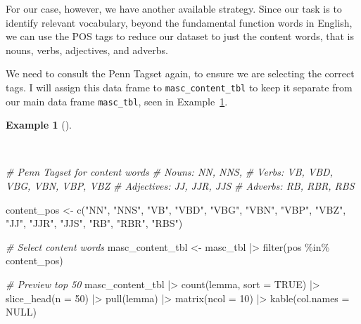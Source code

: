 \documentclass[
  letterpaper,
]{latex/krantz}
\newenvironment{Shaded}{\begin{snugshade}}{\end{snugshade}}
\newcommand{\AttributeTok}[1]{\textcolor[rgb]{0.00,0.00,0.00}{#1}}
\newcommand{\CommentTok}[1]{\textcolor[rgb]{0.00,0.00,0.00}{\textit{#1}}}
\newcommand{\ConstantTok}[1]{\textcolor[rgb]{0.00,0.00,0.00}{#1}}
\newcommand{\DecValTok}[1]{\textcolor[rgb]{0.00,0.00,0.00}{#1}}
\newcommand{\FunctionTok}[1]{\textcolor[rgb]{0.00,0.00,0.00}{#1}}
\newcommand{\NormalTok}[1]{\textcolor[rgb]{0.00,0.00,0.00}{#1}}
\newcommand{\OtherTok}[1]{\textcolor[rgb]{0.00,0.00,0.00}{#1}}
\newcommand{\SpecialCharTok}[1]{\textcolor[rgb]{0.00,0.00,0.00}{#1}}
\newcommand{\StringTok}[1]{\textcolor[rgb]{0.00,0.00,0.00}{#1}}
\theoremstyle{definition}
\newtheorem{example}{Example}[chapter]
\theoremstyle{remark}
\begin{document}
For our case, however, we have another available strategy. Since our
task is to identify relevant vocabulary, beyond the fundamental function
words in English, we can use the POS tags to reduce our dataset to just
the content words, that is nouns, verbs, adjectives, and adverbs.

We need to consult the Penn Tagset again, to ensure we are selecting the
correct tags. I will assign this data frame to
\texttt{masc\_content\_tbl} to keep it separate from our main data frame
\texttt{masc\_tbl}, seen in Example~\ref{exm-eda-masc-filter-pos}.

\begin{example}[]\protect\hypertarget{exm-eda-masc-filter-pos}{}\label{exm-eda-masc-filter-pos}

~

\begin{Shaded}
\begin{Highlighting}[]
\CommentTok{\# Penn Tagset for content words}
\CommentTok{\# Nouns: NN, NNS,}
\CommentTok{\# Verbs: VB, VBD, VBG, VBN, VBP, VBZ}
\CommentTok{\# Adjectives: JJ, JJR, JJS}
\CommentTok{\# Adverbs: RB, RBR, RBS}

\NormalTok{content\_pos }\OtherTok{\textless{}{-}} \FunctionTok{c}\NormalTok{(}\StringTok{"NN"}\NormalTok{, }\StringTok{"NNS"}\NormalTok{, }\StringTok{"VB"}\NormalTok{, }\StringTok{"VBD"}\NormalTok{, }\StringTok{"VBG"}\NormalTok{, }\StringTok{"VBN"}\NormalTok{, }\StringTok{"VBP"}\NormalTok{, }\StringTok{"VBZ"}\NormalTok{, }\StringTok{"JJ"}\NormalTok{, }\StringTok{"JJR"}\NormalTok{, }\StringTok{"JJS"}\NormalTok{, }\StringTok{"RB"}\NormalTok{, }\StringTok{"RBR"}\NormalTok{, }\StringTok{"RBS"}\NormalTok{)}

\CommentTok{\# Select content words}
\NormalTok{masc\_content\_tbl }\OtherTok{\textless{}{-}}
\NormalTok{  masc\_tbl }\SpecialCharTok{|\textgreater{}}
  \FunctionTok{filter}\NormalTok{(pos }\SpecialCharTok{\%in\%}\NormalTok{ content\_pos)}

\CommentTok{\# Preview top 50}
\NormalTok{masc\_content\_tbl }\SpecialCharTok{|\textgreater{}}
  \FunctionTok{count}\NormalTok{(lemma, }\AttributeTok{sort =} \ConstantTok{TRUE}\NormalTok{) }\SpecialCharTok{|\textgreater{}}
  \FunctionTok{slice\_head}\NormalTok{(}\AttributeTok{n =} \DecValTok{50}\NormalTok{) }\SpecialCharTok{|\textgreater{}}
  \FunctionTok{pull}\NormalTok{(lemma) }\SpecialCharTok{|\textgreater{}}
  \FunctionTok{matrix}\NormalTok{(}\AttributeTok{ncol =} \DecValTok{10}\NormalTok{) }\SpecialCharTok{|\textgreater{}}
  \FunctionTok{kable}\NormalTok{(}\AttributeTok{col.names =} \ConstantTok{NULL}\NormalTok{)}
\end{Highlighting}
\end{Shaded}


\end{example}
\end{document}
